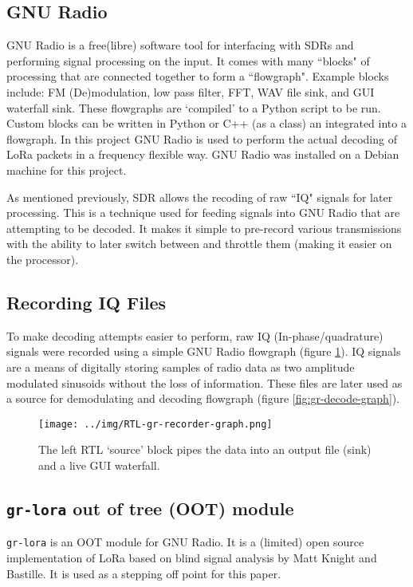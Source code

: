 \documentclass[conference, compsoc]{IEEEtran}
\begin{document}
\subsection{GNU Radio}
GNU Radio\cite{gnuradio} is a free(libre) software tool for interfacing with SDRs and performing signal processing on the input. It comes with many ``blocks" of processing that are connected together to form a ``flowgraph". Example blocks include: FM (De)modulation, low pass filter, FFT, WAV file sink, and GUI waterfall sink. These flowgraphs are `compiled' to a Python script to be run. Custom blocks can be written in Python or C++ (as a class) an integrated into a flowgraph. In this project GNU Radio is used to perform the actual decoding of LoRa packets in a frequency flexible way. GNU Radio was installed on a Debian machine for this project.

As mentioned previously, SDR allows the recoding of raw ``IQ" signals for later processing. This is a technique used for feeding signals into GNU Radio that are attempting to be decoded. It makes it simple to pre-record various transmissions with the ability to later switch between and throttle them (making it easier on the processor).

\subsection{Recording IQ Files}
\label{sec:gr-record}
To make decoding attempts easier to perform, raw IQ (In-phase/quadrature) signals were recorded using a simple GNU Radio flowgraph (figure \ref{fig:rtl-gr-recorder}). IQ signals are a means of digitally storing samples of radio data as two amplitude modulated sinusoids without the loss of information. These files are later used as a source for demodulating and decoding flowgraph (figure \ref{fig:gr-decode-graph}).

\begin{figure}[htbp]
\begin{center}
\texttt{[image: ../img/RTL-gr-recorder-graph.png]}
\caption{The left RTL `source' block pipes the data into an output file (sink) and a live GUI waterfall.}
\label{fig:rtl-gr-recorder}
\end{center}
\end{figure}

\subsection{\texttt{gr-lora} out of tree (OOT) module}
\texttt{gr-lora} is an OOT module for GNU Radio. It is a (limited) open source implementation of LoRa based on blind signal analysis by Matt Knight and Bastille. It is used as a stepping off point for this paper.
\end{document}
